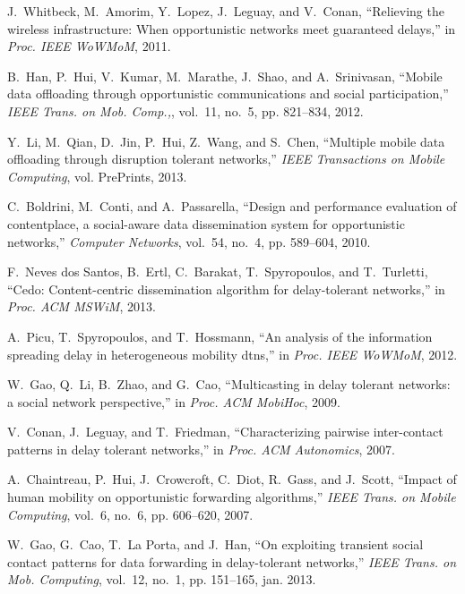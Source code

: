 \documentclass[journal]{IEEEtran}
\begin{document}
\begin{thebibliography}{10}
J.~Whitbeck, M.~Amorim, Y.~Lopez, J.~Leguay, and V.~Conan, ``Relieving the
  wireless infrastructure: When opportunistic networks meet guaranteed
  delays,'' in \emph{Proc. IEEE WoWMoM}, 2011.

B.~Han, P.~Hui, V.~Kumar, M.~Marathe, J.~Shao, and A.~Srinivasan, ``Mobile data
  offloading through opportunistic communications and social participation,''
  \emph{IEEE Trans. on Mob. Comp.,}, vol.~11, no.~5, pp. 821--834, 2012.

Y.~Li, M.~Qian, D.~Jin, P.~Hui, Z.~Wang, and S.~Chen, ``Multiple mobile data
  offloading through disruption tolerant networks,'' \emph{IEEE Transactions on
  Mobile Computing}, vol. PrePrints, 2013.

C.~Boldrini, M.~Conti, and A.~Passarella, ``Design and performance evaluation
  of contentplace, a social-aware data dissemination system for opportunistic
  networks,'' \emph{Computer Networks}, vol.~54, no.~4, pp. 589--604, 2010.

F.~{Neves dos Santos}, B.~Ertl, C.~Barakat, T.~Spyropoulos, and T.~Turletti,
  ``Cedo: Content-centric dissemination algorithm for delay-tolerant
  networks,'' in \emph{Proc. ACM MSWiM}, 2013.

A.~Picu, T.~Spyropoulos, and T.~Hossmann, ``An analysis of the information
  spreading delay in heterogeneous mobility dtns,'' in \emph{Proc. IEEE
  WoWMoM}, 2012.

W.~Gao, Q.~Li, B.~Zhao, and G.~Cao, ``Multicasting in delay tolerant networks:
  a social network perspective,'' in \emph{Proc. ACM MobiHoc}, 2009.

V.~Conan, J.~Leguay, and T.~Friedman, ``Characterizing pairwise inter-contact
  patterns in delay tolerant networks,'' in \emph{Proc. ACM Autonomics}, 2007.

A.~Chaintreau, P.~Hui, J.~Crowcroft, C.~Diot, R.~Gass, and J.~Scott, ``Impact
  of human mobility on opportunistic forwarding algorithms,'' \emph{IEEE Trans.
  on Mobile Computing}, vol.~6, no.~6, pp. 606--620, 2007.

W.~Gao, G.~Cao, T.~{La Porta}, and J.~Han, ``On exploiting transient social
  contact patterns for data forwarding in delay-tolerant networks,'' \emph{IEEE
  Trans. on Mob. Computing}, vol.~12, no.~1, pp. 151--165, jan. 2013.


\end{thebibliography}
\end{document}
